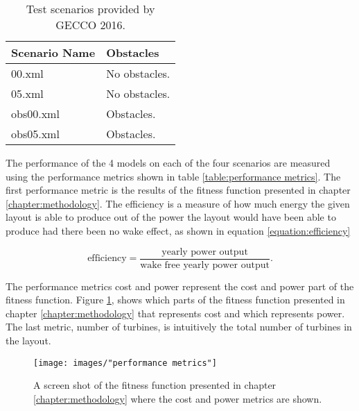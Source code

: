 \begin{table}[h!]
\centering
\caption{Test scenarios provided by GECCO 2016.}
\label{table:scenario properties}
\begin{tabular}{l|l}
\textbf{Scenario Name} & \textbf{Obstacles} \\
\hline
00.xml            & No obstacles. \\
05.xml            & No obstacles. \\
obs00.xml         & Obstacles. \\
obs05.xml         & Obstacles. \\
\end{tabular}
\end{table}

\noindent The performance of the 4 models on each of the four scenarios are measured using the performance metrics shown in table \ref{table:performance metrics}. The first performance metric is the results of the fitness function presented in chapter \ref{chapter:methodology}. The efficiency is a measure of how much energy the given layout is able to produce out of the power the layout would have been able to produce had there been no wake effect, as shown in equation \ref{equation:efficiency}

\begin{equation}
\textrm{efficiency} = \frac{\textrm{yearly power output}}{\textrm{wake free yearly power output}}.
\label{equation:efficiency}
\end{equation}

\noindent The performance metrics cost and power represent the cost and power part of the fitness function. Figure \ref{figure:performance metrics cost and power}, shows which parts of the fitness function presented in chapter \ref{chapter:methodology} that represents cost and which represents power. The last metric, number of turbines, is intuitively the total number of turbines in the layout.\\ 

\begin{figure}[h!]
\begin{center}
\texttt{[image: images/"performance metrics"]}
\caption{A screen shot of the fitness function presented in chapter \ref{chapter:methodology} where the cost and power metrics are shown.}
\label{figure:performance metrics cost and power}
\end{center}
\end{figure}

